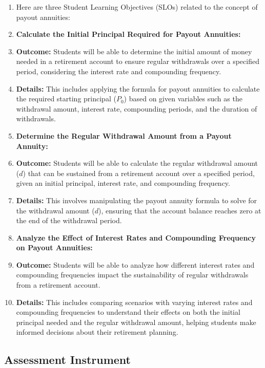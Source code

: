 \begin{enumerate}
    \item Here are three Student Learning Objectives (SLOs) related to the concept of payout annuities:
    \item \textbf{Calculate the Initial Principal Required for Payout Annuities:}
    \item \textbf{Outcome:} Students will be able to determine the initial amount of money needed in a retirement account to ensure regular withdrawals over a specified period, considering the interest rate and compounding frequency.
    \item \textbf{Details:} This includes applying the formula for payout annuities to calculate the required starting principal ($P _0$) based on given variables such as the withdrawal amount, interest rate, compounding periods, and the duration of withdrawals.
    \item \textbf{Determine the Regular Withdrawal Amount from a Payout Annuity:}
    \item \textbf{Outcome:} Students will be able to calculate the regular withdrawal amount ($d$) that can be sustained from a retirement account over a specified period, given an initial principal, interest rate, and compounding frequency.
    \item \textbf{Details:} This involves manipulating the payout annuity formula to solve for the withdrawal amount ($d$), ensuring that the account balance reaches zero at the end of the withdrawal period.
    \item \textbf{Analyze the Effect of Interest Rates and Compounding Frequency on Payout Annuities:}
    \item \textbf{Outcome:} Students will be able to analyze how different interest rates and compounding frequencies impact the sustainability of regular withdrawals from a retirement account.
    \item \textbf{Details:} This includes comparing scenarios with varying interest rates and compounding frequencies to understand their effects on both the initial principal needed and the regular withdrawal amount, helping students make informed decisions about their retirement planning.
\end{enumerate}


\subsection{Assessment Instrument}
\label{ssec:asse-3669}


